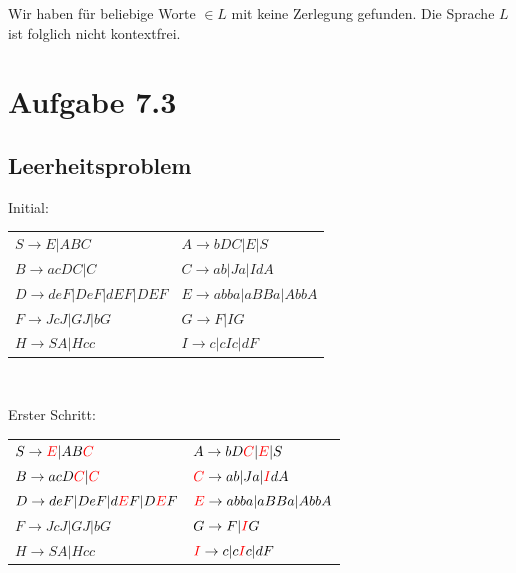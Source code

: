\documentclass{article}
\begin{document}
\bigskip

Wir haben für beliebige Worte $\in L$ mit  keine Zerlegung gefunden. Die Sprache $L$ ist folglich nicht kontextfrei.


\section*{Aufgabe 7.3}
\subsection*{Leerheitsproblem}
\begin{center}

\begin{samepage}
Initial:\\
\begin{tabular}{ll}
$S \rightarrow E | ABC$               & $A \rightarrow bDC | E | S$ \\
$B \rightarrow acDC | C$              & $C \rightarrow ab | Ja | IdA$ \\
$D \rightarrow deF | DeF | dEF | DEF$ & $E \rightarrow abba | aBBa | AbbA$ \\
$F \rightarrow JcJ | GJ | bG$         & $G \rightarrow F | IG$ \\
$H \rightarrow SA | Hcc$              & $I \rightarrow c | cIc | dF$
\end{tabular}\\
\end{samepage}

\begin{samepage}
Erster Schritt:\\
\begin{tabular}{ll}
$S \rightarrow {\color{red}E} | AB{\color{red}C}$               & $A \rightarrow bD{\color{red}C} | {\color{red}E} | S$ \\
$B \rightarrow acD{\color{red}C} | {\color{red}C}$              & ${\color{red}C} \rightarrow ab | Ja | {\color{red}I}dA$ \\
$D \rightarrow deF | DeF | d{\color{red}E}F | D{\color{red}E}F$ & ${\color{red}E} \rightarrow abba | aBBa | AbbA$ \\
$F \rightarrow JcJ | GJ | bG$                                   & $G \rightarrow F | {\color{red}I}G$ \\
$H \rightarrow SA | Hcc$                                        & ${\color{red}I} \rightarrow c | c{\color{red}I}c | dF$
\end{tabular}\\
\end{samepage}


\end{center}
\end{document}
